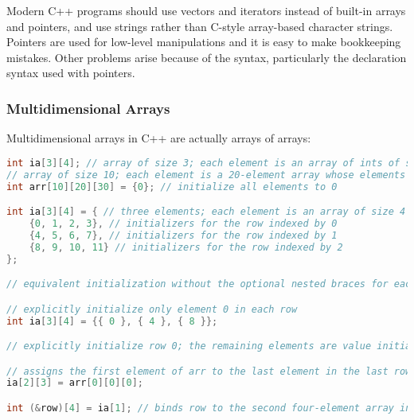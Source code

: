 Modern C++ programs should use vectors and iterators instead of built-in arrays and pointers, and use strings rather than C-style array-based character strings. Pointers are used for low-level manipulations and it is easy to make bookkeeping mistakes. Other problems arise because of the syntax, particularly the declaration syntax used with pointers.

\subsubsection{Multidimensional Arrays}

Multidimensional arrays in C++ are actually arrays of arrays:
\begin{lstlisting}[language=C++]
int ia[3][4]; // array of size 3; each element is an array of ints of size 4 
// array of size 10; each element is a 20-element array whose elements are arrays of 30 ints 
int arr[10][20][30] = {0}; // initialize all elements to 0

int ia[3][4] = { // three elements; each element is an array of size 4 
    {0, 1, 2, 3}, // initializers for the row indexed by 0 
    {4, 5, 6, 7}, // initializers for the row indexed by 1 
    {8, 9, 10, 11} // initializers for the row indexed by 2 
};

// equivalent initialization without the optional nested braces for each row int ia[3]int ia[4] = {0,1,2,3,4,5,6,7,8,9,10,11};

// explicitly initialize only element 0 in each row 
int ia[3][4] = {{ 0 }, { 4 }, { 8 }};

// explicitly initialize row 0; the remaining elements are value initialized int ix[3]int ia[4] = {0, 3, 6, 9};

// assigns the first element of arr to the last element in the last row of ia 
ia[2][3] = arr[0][0][0]; 

int (&row)[4] = ia[1]; // binds row to the second four-element array in ia
\end{lstlisting}
